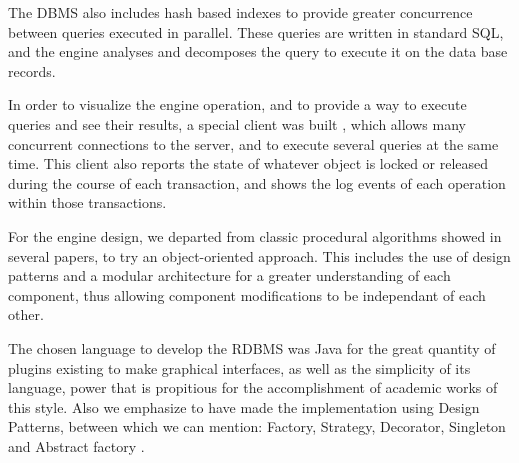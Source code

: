 The DBMS also includes hash based indexes to provide greater concurrence between queries executed in parallel. These queries are written in standard SQL, and the engine analyses and decomposes the query to execute it on the data base records.

In order to visualize the engine operation, and to provide a way to execute queries and see their results, a special client was built \cite{LBCP07a}, which allows many concurrent connections to the server, and to execute several queries at the same time. This client also reports the state of whatever object is locked or released during the course of each transaction, and shows the log events of each operation within those transactions.

For the engine design, we departed from classic procedural algorithms showed in several papers, to try an object-oriented approach. This includes the use of design patterns and a modular architecture for a greater understanding of each component, thus allowing component modifications to be independant of each other.

The chosen language to develop the RDBMS was Java for the great quantity of plugins existing to make graphical interfaces, as well as the simplicity of its language, power that is propitious for the accomplishment of academic works of this style. Also we emphasize to have made the implementation using Design Patterns, between which we can mention: Factory, Strategy, Decorator, Singleton and Abstract factory \cite{GHJV95}.
